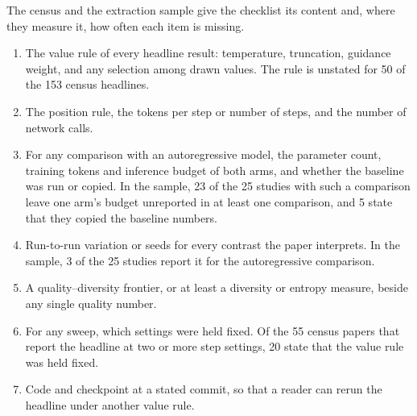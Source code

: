 The census and the extraction sample give the checklist its content and, where they measure it, how often each item is missing.
\begin{enumerate}
  \item The value rule of every headline result: temperature, truncation, guidance weight, and any selection among drawn values. The rule is unstated for 50 of the 153 census headlines.
  \item The position rule, the tokens per step or number of steps, and the number of network calls.
  \item For any comparison with an autoregressive model, the parameter count, training tokens and inference budget of both arms, and whether the baseline was run or copied. In the sample, 23 of the 25 studies with such a comparison leave one arm's budget unreported in at least one comparison, and 5 state that they copied the baseline numbers.
  \item Run-to-run variation or seeds for every contrast the paper interprets. In the sample, 3 of the 25 studies report it for the autoregressive comparison.
  \item A quality--diversity frontier, or at least a diversity or entropy measure, beside any single quality number.
  \item For any sweep, which settings were held fixed. Of the 55 census papers that report the headline at two or more step settings, 20 state that the value rule was held fixed.
  \item Code and checkpoint at a stated commit, so that a reader can rerun the headline under another value rule.
\end{enumerate}
